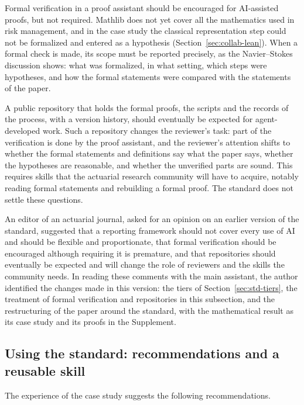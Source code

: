 Formal verification in a proof assistant should be encouraged for AI-assisted proofs, but not required. Mathlib
does not yet cover all the mathematics used in risk management, and in the case study the classical representation
step could not be formalized and entered as a hypothesis (Section~\ref{sec:collab-lean}). When a formal check is
made, its scope must be reported precisely, as the Navier--Stokes discussion shows: what was formalized, in what
setting, which steps were hypotheses, and how the formal statements were compared with the statements of the paper.

A public repository that holds the formal proofs, the scripts and the records of the process, with a version
history, should eventually be expected for agent-developed work. Such a repository changes the reviewer's task:
part of the verification is done by the proof assistant, and the reviewer's attention shifts to whether the formal
statements and definitions say what the paper says, whether the hypotheses are reasonable, and whether the
unverified parts are sound. This requires skills that the actuarial research community will have to acquire,
notably reading formal statements and rebuilding a formal proof. The standard does not settle these questions.

\begin{discussion}
An editor of an actuarial journal, asked for an opinion on an earlier version of the standard, suggested that a
reporting framework should not cover every use of AI and should be flexible and proportionate, that formal
verification should be encouraged although requiring it is premature, and that repositories should eventually be
expected and will change the role of reviewers and the skills the community needs. In reading these comments with
the main assistant, the author identified the changes made in this version: the tiers of
Section~\ref{sec:std-tiers}, the treatment of formal verification and repositories in this subsection, and the
restructuring of the paper around the standard, with the mathematical result as its case study and its proofs in
the Supplement.
\end{discussion}

\subsection{Using the standard: recommendations and a reusable skill}\label{sec:std-use}

The experience of the case study suggests the following recommendations.

